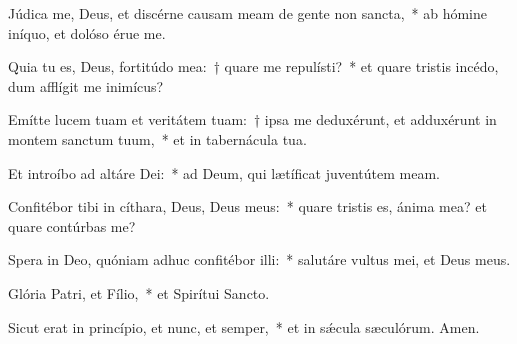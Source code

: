 \item Júdica me, Deus, et discérne causam meam de gente non sancta,~* ab hómine iníquo, et dolóso érue me.

\item Quia tu es, Deus, fortitúdo mea:~† quare me repulísti?~* et quare tristis incédo, dum afflígit me inimícus?

\item Emítte lucem tuam et veritátem tuam:~† ipsa me deduxérunt, et adduxérunt in montem sanctum tuum,~* et in tabernácula tua.

\item Et introíbo ad altáre Dei:~* ad Deum, qui lætíficat juventútem meam.

\item Confitébor tibi in cíthara, Deus, Deus meus:~* quare tristis es, ánima mea? et quare contúrbas me?

\item Spera in Deo, quóniam adhuc confitébor illi:~* salutáre vultus mei, et Deus meus.

\item Glória Patri, et Fílio,~* et Spirítui Sancto.

\item Sicut erat in princípio, et nunc, et semper,~* et in sǽcula sæculórum. Amen.

